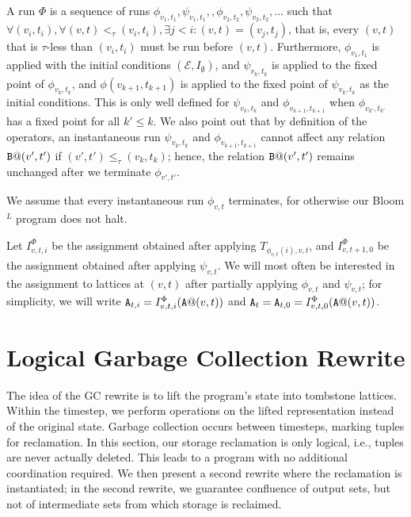 \documentclass{article}
\numberwithin{equation}{section}
\renewcommand{\tt}[1]{\ifmmode\text{\texttt{#1}}\else\texttt{#1}\fi}
\begin{document}
A run $\Phi$ is a sequence of runs $\phi_{v_1,t_1}, \psi_{v_1,t_1},, \phi_{v_2,t_2}, \psi_{v_2,t_2}, \dots$ such that $\forall (v_i, t_i), \forall (v, t) <_\tau (v_i, t_i), \exists j < i: (v, t) = (v_j, t_j)$, that is, every $(v,t)$ that is $\tau$-less than $(v_i, t_i)$ must be run before $(v,t)$.
Furthermore, $\phi_{v_1, t_1}$ is applied with the initial conditions $(\mathcal{E}, I_\emptyset)$, and $\psi_{v_k,t_k}$ is applied to the fixed point of $\phi_{v_k, t_k}$, and $\phi(v_{k+1}, t_{k+1})$ is applied to the fixed point of $\psi_{v_k, t_k}$ as the initial conditions.
This is only well defined for $\psi_{v_k, t_k}$ and $\phi_{v_{k+1}, t_{k+1}}$ when $\phi_{v_{k'}, t_{k'}}$ has a fixed point for all $k' \leq k$.
We also point out that by definition of the operators, an instantaneous run $\psi_{v_k,t_k}$ and $\phi_{v_{k+1},t_{k+1}}$ cannot affect any relation $\tt{B}@(v',t')$ if $(v',t') \leq_\tau (v_k,t_k)$;
hence, the relation $\tt{B}@(v',t')$ remains unchanged after we terminate $\phi_{v',t'}$.

We assume that every instantaneous run $\phi_{v,t}$ terminates, for otherwise our Bloom$^L$ program does not halt.

Let $I^\Phi_{v,t,i}$ be the assignment obtained after applying $T_{\phi_{v,t}(i),v,t}$, and $I^\Phi_{v,t+1,0}$ be the assignment obtained after applying $\psi_{v,t}$.
We will most often be interested in the assignment to lattices at $(v,t)$ after partially applying $\phi_{v,t}$ and $\psi_{v,t}$;
for simplicity, we will write $\tt{A}_{t,i} = I^\Phi_{v,t,i}(\tt{A}@(v,t))$ and $\tt{A}_{t} = \tt{A}_{t,0} = I^\Phi_{v,t,0}(\tt{A}@(v,t))$.



\section{Logical Garbage Collection Rewrite}
\label{sec:logical}
The idea of the GC rewrite is to lift the program's state into tombstone lattices.
Within the timestep, we perform operations on the lifted representation instead of the original state.
Garbage collection occurs between timesteps, marking tuples for reclamation.
In this section, our storage reclamation is only logical, i.e., tuples are never actually deleted.
This leads to a program with no additional coordination required.
We then present a second rewrite where the reclamation is instantiated; in the second rewrite, we guarantee confluence of output sets, but not of intermediate sets from which storage is reclaimed.
\end{document}
